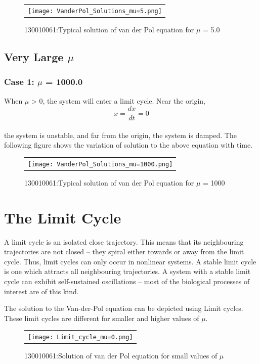 \documentclass[12pt, a4paper]{report}
\begin{document}
\begin{figure}[H]
	\centering
	\begin{tabular} {l}
	\texttt{[image: VanderPol\_Solutions\_mu=5.png]} 
	\end{tabular}
	\caption{130010061:Typical solution of van der Pol equation for $\mu$ = 5.0}
\end{figure}
\label{fig4} 

\section{Very Large $\mu$}
\subsection{Case 1: $\mu$ = 1000.0}
When $\mu$ > 0, the system will enter a limit cycle. Near the origin, 
\begin{equation}
x = \frac{dx}{dt} = 0
\end{equation}\\

the system is unstable, and far from the origin, the system is damped.
The following figure shows the variation of solution to the above equation with time.

\begin{figure}[H]
	\centering
	\begin{tabular} {l}
	\texttt{[image: VanderPol\_Solutions\_mu=1000.png]} 
	\end{tabular}
	\caption{130010061:Typical solution of van der Pol equation for $\mu$ = 1000}
\end{figure}
\label{fig5} 

\chapter{The Limit Cycle}
A limit cycle is an isolated close trajectory. This means that its neighbouring trajectories are not closed – they spiral either towards or away from the limit cycle. Thus, limit cycles can only occur in nonlinear systems. A stable limit cycle is one which attracts all
neighbouring trajectories. A system with a stable limit cycle can exhibit self-sustained oscillations – most of the biological processes of interest are of this kind.

The solution to the Van-der-Pol equation can be depicted using Limit cycles. These limit cycles are different for smaller and higher values of $\mu$. 

\begin{figure}[H]
	\centering
	\begin{tabular} {l}
	\texttt{[image: Limit\_cycle\_mu=0.png]} 
	\end{tabular}
	\caption{130010061:Solution of van der Pol equation for small values of $\mu$}
\end{figure}
\label{fig6} 
\end{document}
